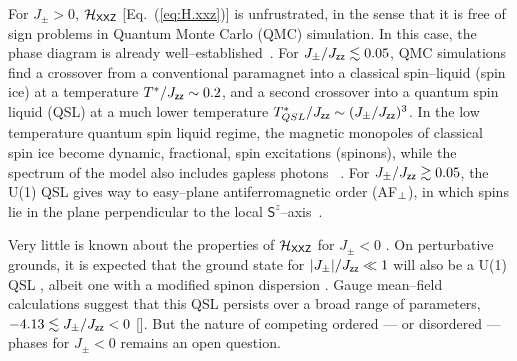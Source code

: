 \documentclass[apsrev4-1,prx,superscriptaddress,floatfix,twocolumn,longbibliography]{revtex4-1}
\begin{document}

For $J_{\pm} > 0$, $\mathcal{H}_{\sf XXZ}$ [Eq.~(\ref{eq:H.xxz})] 
is unfrustrated, in the sense that it is free of sign problems in 
Quantum Monte Carlo (QMC) simulation.   
%
In this case, the phase diagram is already 
well--established~\cite{banerjee08,kato15,shannon-book-chapter}.  
%
For \mbox{$J_{\pm}/J_{\sf zz} \lesssim 0.05$}, QMC simulations find a crossover from 
a conventional paramagnet into a classical spin--liquid (spin ice) at a temperature 
$T^*/J_{\sf zz} \sim 0.2$, and a second crossover into a quantum spin liquid (QSL) 
at a much lower temperature \mbox{$T_{QSL}^*/J_{\sf zz} \sim (J_{\pm}/J_{\sf zz})^3$}.  
%
In the low temperature quantum spin liquid regime, the magnetic monopoles 
of classical spin ice become dynamic, fractional, spin excitations 
(spinons), while the spectrum of the model also includes gapless photons~
\cite{hermele04,benton12}.  
%
For \mbox{$J_{\pm}/ J_{\sf zz} \gtrsim  0.05$}, the U(1) QSL gives way to easy--plane 
antiferromagnetic order (AF$_{\sf \perp}$), in which spins lie in the plane 
perpendicular to the local $\mathsf{S}^z$--axis~\cite{banerjee08,kato15,shannon-book-chapter}.   


Very little is known about the properties of $\mathcal{H}_{\sf XXZ}$
for $J_{\pm} < 0$ \cite{Onoda2011a,Lee12,petit16-PRB94}.
%
On perturbative grounds, it is expected that the ground state for 
$|J_{\pm}|/J_{\sf zz} \ll 1$ will also be a U(1) QSL \cite{hermele04}, 
albeit one with a modified spinon dispersion \cite{Lee12,chen-arXiv.1704.02734}.
%
Gauge mean--field calculations suggest that this QSL persists over a broad range 
of parameters, \mbox{$-4.13 \lesssim J_{\pm}/ J_{\sf zz} < 0$} [].
%
But the nature of competing ordered --- or disordered --- phases 
for $J_{\pm} < 0$ remains an open question.

\end{document}
